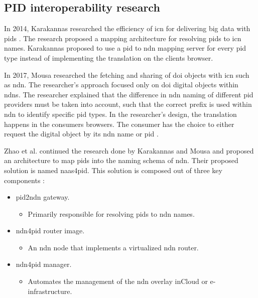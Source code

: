 \documentclass[conference]{IEEEtran}
\begin{document}

\subsection{PID interoperability research}
In 2014, Karakannas researched the efficiency of \gls{icn} for delivering big data with \glspl{pid} \cite{icn-bd}. The research proposed a mapping architecture for resolving \glspl{pid} to \gls{icn} names. Karakannas proposed to use a \gls{pid} to \gls{ndn} mapping server for every \gls{pid} type instead of implementing the translation on the clients browser.

In 2017, Mousa researched the fetching and sharing of \gls{doi} objects with \gls{icn} such as \gls{ndn}. The researcher's approach focused only on \gls{doi} digital objects within \glspl{ndn}. The researcher explained that the difference in \gls{ndn} naming of different \gls{pid} providers must be taken into account, such that the correct prefix is used within \gls{ndn} to identify specific \gls{pid} types. In the researcher's design, the translation happens in the consumers browsers. The consumer has the choice to either request the digital object by its \gls{ndn} name or \gls{pid} \cite{ndn-app-aware}.

Zhao et al. continued the research done by Karakannas \cite{icn-bd} and Mousa \cite{ndn-app-aware} and proposed an architecture to map \glspl{pid} into the naming schema of \gls{ndn}. Their proposed solution is named \gls{naas4pid}. This solution is composed out of three key components \cite{koulouzis2018information}:
\begin{itemize}
  \item \gls{pid}2\gls{ndn} gateway.
  \begin{itemize}
        \item Primarily responsible for resolving \glspl{pid} to \gls{ndn} names.
  \end{itemize}
  \item \gls{ndn}4\gls{pid} router image.
    \begin{itemize}
        \item An \gls{ndn} node that implements a virtualized \gls{ndn} router.
    \end{itemize}
  \item \gls{ndn}4\gls{pid} manager.
    \begin{itemize}
        \item Automates the management of the \gls{ndn} overlay in\newline Cloud or e-infrastructure.
    \end{itemize}
\end{itemize}
\end{document}
